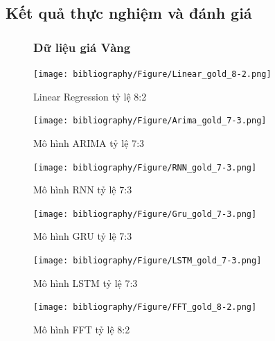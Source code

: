 \documentclass[conference]{IEEEtran}
\begin{document}
\subsection{Kết quả thực nghiệm và đánh giá}
\begin{figure}[t] 
\subsubsection{Dữ liệu giá Vàng}
    \raggedright
    \begin{minipage}{0.5\textwidth}
        \centering
        \begin{minipage}{0.45\textwidth}
            \centering
            \texttt{[image: bibliography/Figure/Linear\_gold\_8-2.png]}
            \caption{Linear Regression tỷ lệ 8:2}
        \end{minipage}
        \hfill
        \begin{minipage}{0.45\textwidth}
            \centering
            \texttt{[image: bibliography/Figure/Arima\_gold\_7-3.png]}
            \caption{Mô hình ARIMA tỷ lệ 7:3}
        \end{minipage}
        \hfill
        \begin{minipage}{0.45\textwidth}
            \centering
            \texttt{[image: bibliography/Figure/RNN\_gold\_7-3.png]}
            \caption{Mô hình RNN tỷ lệ 7:3}
        \end{minipage}
        \hfill
        \begin{minipage}{0.45\textwidth}
            \centering
            \texttt{[image: bibliography/Figure/Gru\_gold\_7-3.png]} 
            \caption{Mô hình GRU tỷ lệ 7:3}
        \end{minipage}
        \hfill
        \begin{minipage}{0.45\textwidth}
            \centering
            \texttt{[image: bibliography/Figure/LSTM\_gold\_7-3.png]} 
            \caption{Mô hình LSTM tỷ lệ 7:3}
        \end{minipage}
        \hfill
        \begin{minipage}{0.45\textwidth}
            \centering
            \texttt{[image: bibliography/Figure/FFT\_gold\_8-2.png]} 
            \caption{Mô hình FFT tỷ lệ 8:2}
        \end{minipage}
         \hfill
        \begin{minipage}{0.45\textwidth}

\end{minipage}
\end{minipage}
\end{figure}
\end{document}
